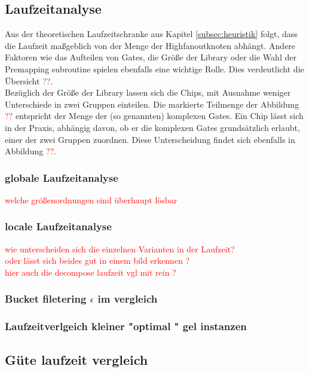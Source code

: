\documentclass[11pt, a4paper, german]{article}
\begin{document}
 \subsection{Laufzeitanalyse}
 \label{subsec:laufzeitanalyse}
Aus der theoretischen Laufzeitschranke aus Kapitel \ref{subsec:heuristik} folgt, dass die Laufzeit maßgeblich von der Menge der Highfanoutknoten abhängt. Andere Faktoren wie das Aufteilen von Gates, die Größe der Library oder die Wahl der Premapping subroutine spielen ebenfalls eine wichtige Rolle. Dies verdeutlicht die Übersicht \textcolor{red}{??}.\\
 Bezüglich der Größe der Library lassen sich die Chips, mit Ausnahme weniger Unterschiede in zwei Gruppen einteilen. Die markierte Teilmenge der Abbildung \textcolor{red}{??} entspricht der Menge der (so genannten) komplexen Gates. Ein Chip lässt sich in der Praxis, abhängig davon, ob er die komplexen Gates grundsätzlich erlaubt, einer der zwei Gruppen zuordnen. Diese Unterscheidung findet sich ebenfalls in Abbildung \textcolor{red}{??}.
 
\subsubsection{globale Laufzeitanalyse}
\textcolor{red}{welche größenordnungen sind überhaupt lösbar}

\subsubsection{locale Laufzeitanalyse}
\textcolor{red}{wie unterscheiden sich die einzelnen Varianten in der Laufzeit? \\ oder lässt sich beides gut in einem bild erkennen ?} \\

\textcolor{red}{hier auch die decompose laufzeit vgl mit rein ?}

\subsubsection{Bucket filetering $\epsilon$ im vergleich } 
 
\subsubsection{Laufzeitverlgeich kleiner "optimal " gel instanzen}


\subsection{Güte laufzeit vergleich}
\end{document}
